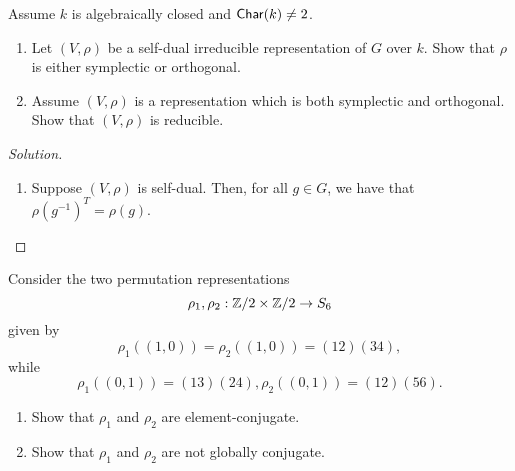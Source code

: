 \newpage


\begin{problem}
Assume $k$ is algebraically closed and $\mathsf{Char}(k) \neq 2$.

\begin{enumerate}[font=\normalfont,label=\textbf{(\alph*)}]
\item Let $(V, \rho)$ be a self-dual irreducible representation of $G$ over $k$. Show that $\rho$ is either symplectic or orthogonal.

\item Assume $(V, \rho)$ is a representation which is both symplectic and orthogonal. Show that $(V, \rho)$ is reducible.

\end{enumerate}
\end{problem}

\begin{proof}[Solution]
\hfill
\begin{enumerate}[font=\normalfont,label=\textbf{(\alph*)}, wide]
\item Suppose $(V, \rho)$ is self-dual. Then, for all $g \in G$, we have that $\rho(g^{-1})^T = \rho(g)$.
\end{enumerate}
\end{proof}

\newpage


\begin{problem}
Consider the two permutation representations
\[
\rho_1, \rho_2 : \mathbb{Z}/2 \times \mathbb{Z}/2 \to S_6
\]
given by
\[
\rho_1 ((1, 0)) = \rho_2((1, 0)) = (12)(34),
\]
while
\[
\rho_1 ((0, 1)) = (13)(24), \rho_2((0, 1)) = (12)(56).
\]
\begin{enumerate}[font=\normalfont,label=\textbf{(\alph*)}]
\item Show that $\rho_1$ and $\rho_2$ are element-conjugate.
\item Show that $\rho_1$ and $\rho_2$ are not globally conjugate.

\end{enumerate}
\end{problem}

